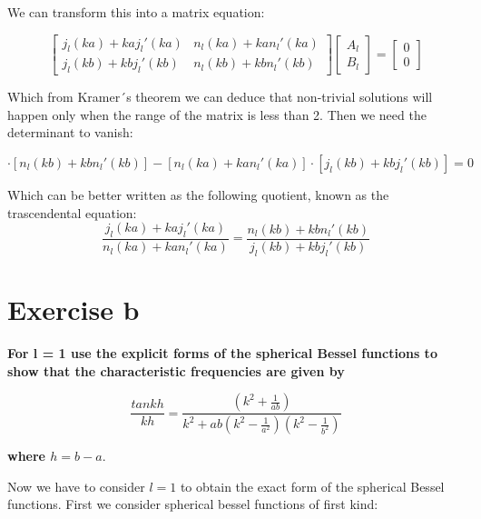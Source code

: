 \documentclass[a4paper,12pt]{article}
\begin{document}
We can transform this into a matrix equation: 

\begin{equation}
\begin{bmatrix}     j_l(ka) + ka j_l \prime(ka) & n_l(ka) + ka n_l \prime (ka) \\
    j_l(kb) + kb j_l \prime (kb) & n_l(kb) + kb n_l \prime (kb) \end{bmatrix}
 \begin{bmatrix}
  A_l \\
  B_l 
 \end{bmatrix}
 =
 \begin{bmatrix}
   0 \\
   0
   \end{bmatrix}
\label{eq:matrix}
\end{equation}



Which from Kramer´s theorem we can deduce that non-trivial solutions will happen only when the range of the matrix is less than 2. Then we need the determinant to vanish: 

\begin{equation}
[j_l(ka) + ka j_l \prime(ka)] \cdot [n_l(kb) + kb n_l \prime (kb)] - [n_l(ka) + ka n_l \prime (ka)]\cdot [j_l(kb) + kb j_l \prime (kb)] = 0
\label{eq:determina}
\end{equation} 

Which can be better written as the following quotient, known as the trascendental equation: 
\begin{equation}
\frac{j_l(ka) + ka j_l \prime(ka)}{n_l(ka) + ka n_l \prime (ka)} = \frac{n_l(kb) + kb n_l \prime (kb)}{j_l(kb) + kb j_l \prime (kb)}
\label{eq:quot}
\end{equation}


\newpage 

\section{Exercise b}

\textbf{For l = 1 use the explicit forms of the spherical Bessel functions to show that the
characteristic frequencies are given by}

$$\frac{tankh}{kh} = \frac{(k^2 + \frac{1}{ab})}{k^2 + ab(k^2 - \frac{1}{a^2})(k^2 - \frac{1}{b^2})}$$

\textbf{where $h = b -a.$}

Now we have to consider $l = 1$ to obtain the exact form of the spherical Bessel functions. First we consider spherical bessel functions of first kind: 
\end{document}
